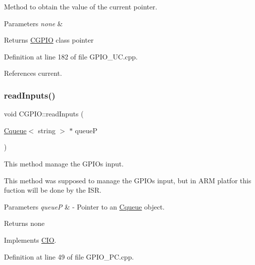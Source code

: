 Method to obtain the value of the current pointer. 


\begin{DoxyParams}{Parameters}
{\em none} & \\
\hline
\end{DoxyParams}
\begin{DoxyReturn}{Returns}
\mbox{\hyperlink{class_c_g_p_i_o}{C\+G\+P\+IO}} class pointer 
\end{DoxyReturn}


Definition at line 182 of file G\+P\+I\+O\+\_\+\+U\+C.\+cpp.



References current.

\mbox{\label{class_c_g_p_i_o_a6168af74d745d959e90deddb5c298385}} 
\subsubsection{\texorpdfstring{read\+Inputs()}{readInputs()}}
{\footnotesize\ttfamily void C\+G\+P\+I\+O\+::read\+Inputs (\begin{DoxyParamCaption}\item[{\mbox{\hyperlink{class_cqueue}{Cqueue}}$<$ string $>$ $\ast$}]{queueP }\end{DoxyParamCaption})\hspace{0.3cm}{\ttfamily [virtual]}}



This method manage the G\+P\+I\+Os input. 

This method was supposed to manage the G\+P\+I\+Os input, but in A\+RM platfor this fuction will be done by the I\+SR.


\begin{DoxyParams}{Parameters}
{\em queueP} & -\/ Pointer to an \mbox{\hyperlink{class_cqueue}{Cqueue}} object. \\
\hline
\end{DoxyParams}
\begin{DoxyReturn}{Returns}
none 
\end{DoxyReturn}


Implements \mbox{\hyperlink{class_c_i_o}{C\+IO}}.



Definition at line 49 of file G\+P\+I\+O\+\_\+\+P\+C.\+cpp.

\mbox{\label{class_c_g_p_i_o_a06bc11242ea8f85b5d71419bf70ef674}} 
